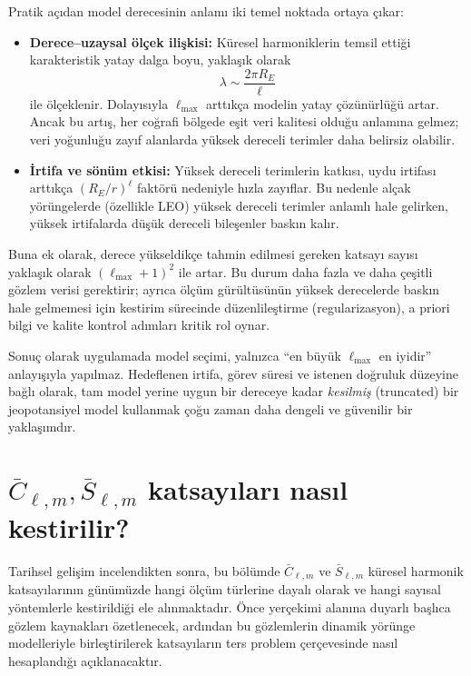 Pratik açıdan model derecesinin anlamı iki temel noktada ortaya çıkar:

\begin{itemize}
\item \textbf{Derece--uzaysal ölçek ilişkisi:}
Küresel harmoniklerin temsil ettiği karakteristik yatay dalga boyu,
yaklaşık olarak
\[
\lambda \sim \frac{2\pi R_E}{\ell}
\]
ile ölçeklenir.
Dolayısıyla $\ell_{\max}$ arttıkça modelin yatay çözünürlüğü artar.
Ancak bu artış, her coğrafi bölgede eşit veri kalitesi olduğu anlamına gelmez;
veri yoğunluğu zayıf alanlarda yüksek dereceli terimler
daha belirsiz olabilir.

\item \textbf{İrtifa ve sönüm etkisi:}
Yüksek dereceli terimlerin katkısı,
uydu irtifası arttıkça $(R_E/r)^{\ell}$ faktörü nedeniyle hızla zayıflar.
Bu nedenle alçak yörüngelerde (özellikle LEO)
yüksek dereceli terimler anlamlı hale gelirken,
yüksek irtifalarda düşük dereceli bileşenler baskın kalır.
\end{itemize}

Buna ek olarak, derece yükseldikçe tahmin edilmesi gereken katsayı sayısı
yaklaşık olarak $(\ell_{\max}+1)^2$ ile artar.
Bu durum daha fazla ve daha çeşitli gözlem verisi gerektirir;
ayrıca ölçüm gürültüsünün yüksek derecelerde baskın hale gelmemesi için
kestirim sürecinde düzenlileştirme (regularizasyon),
a priori bilgi ve kalite kontrol adımları kritik rol oynar.

Sonuç olarak uygulamada model seçimi,
yalnızca ``en büyük $\ell_{\max}$ en iyidir'' anlayışıyla yapılmaz.
Hedeflenen irtifa, görev süresi ve istenen doğruluk düzeyine bağlı olarak,
tam model yerine uygun bir dereceye kadar
\emph{kesilmiş} (truncated) bir jeopotansiyel model kullanmak
çoğu zaman daha dengeli ve güvenilir bir yaklaşımdır.



\section{$\bar C_{\ell,m},\bar S_{\ell,m}$ katsayıları nasıl kestirilir?}
\label{sec:how_CS_estimated}

Tarihsel gelişim incelendikten sonra, bu bölümde
$\bar C_{\ell,m}$ ve $\bar S_{\ell,m}$ küresel harmonik katsayılarının günümüzde hangi ölçüm türlerine dayalı olarak ve hangi sayısal yöntemlerle kestirildiği ele alınmaktadır.
Önce yerçekimi alanına duyarlı başlıca gözlem kaynakları özetlenecek, ardından bu gözlemlerin dinamik yörünge modelleriyle birleştirilerek katsayıların ters problem çerçevesinde nasıl hesaplandığı açıklanacaktır.


